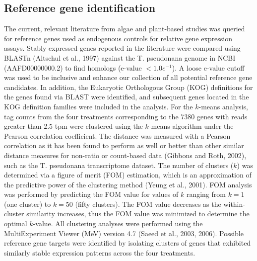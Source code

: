 \subsection{Reference gene identification}
\par The current, relevant literature from algae and plant-based studies was queried for reference genes used as endogenous controls for relative gene expression assays. Stably expressed genes reported in the literature were compared using BLASTn (Altschul et al., 1997) against the T. pseudonana genome in NCBI (AAFD00000000.2) to find homologs (e-value $< 1.0e^{-1}$). A loose e-value cutoff was used to be inclusive and enhance our collection of all potential reference gene candidates. In addition, the Eukaryotic Orthologous Group (KOG) definitions for the genes found via BLAST were identified, and subsequent genes located in the KOG definition families were included in the analysis. 
For the $k$-means analysis, tag counts from the four treatments corresponding to the 7380 genes with reads greater than 2.5 tpm were clustered using the $k$-means algorithm under the Pearson correlation coefficient. The distance was measured with a Pearson correlation as it has been found to perform as well or better than other similar distance measures for non-ratio or count-based data (Gibbons and Roth, 2002), such as the T. pseudonana transcriptome dataset. The number of clusters ($k$) was determined via a figure of merit (FOM) estimation, which is an approximation of the predictive power of the clustering method (Yeung et al., 2001). FOM analysis was performed by predicting the FOM value for values of $k$ ranging from $k=1$ (one cluster) to $k=50$ (fifty clusters). The FOM value decreases as the within-cluster similarity increases, thus the FOM value was minimized to determine the optimal $k$-value. All clustering analyses were performed using the MultiExperiment Viewer (MeV) version 4.7 (Saeed et al., 2003, 2006). Possible reference gene targets were identified by isolating clusters of genes that exhibited similarly stable expression patterns across the four treatments. \par
